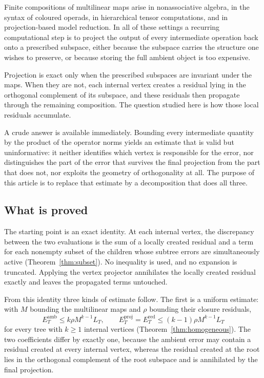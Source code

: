 \documentclass[11pt]{amsart}
\theoremstyle{definition}
\theoremstyle{remark}
\newcommand{\amb}{\mathrm{amb}}
\newcommand{\proj}{\mathrm{proj}}
\newcommand{\red}{\mathrm{red}}
\begin{document}
Finite compositions of multilinear maps arise in nonassociative algebra, in the syntax of
coloured operads, in hierarchical tensor computations, and in projection-based model
reduction. In all of these settings a recurring computational step is to project the
output of every intermediate operation back onto a prescribed subspace, either because
the subspace carries the structure one wishes to preserve, or because storing the full
ambient object is too expensive.

Projection is exact only when the prescribed subspaces are invariant under the maps. When
they are not, each internal vertex creates a residual lying in the orthogonal complement
of its subspace, and these residuals then propagate through the remaining composition.
The question studied here is how those local residuals accumulate.

A crude answer is available immediately. Bounding every intermediate quantity by the
product of the operator norms yields an estimate that is valid but uninformative: it
neither identifies which vertex is responsible for the error, nor distinguishes the part
of the error that survives the final projection from the part that does not, nor exploits
the geometry of orthogonality at all. The purpose of this article is to replace that
estimate by a decomposition that does all three.

\subsection*{What is proved}

The starting point is an exact identity. At each internal vertex, the discrepancy between
the two evaluations is the sum of a locally created residual and a term for each nonempty
subset of the children whose subtree errors are simultaneously active
(Theorem~\ref{thm:subset}). No inequality is used, and no expansion is truncated. Applying
the vertex projector annihilates the locally created residual exactly and leaves the
propagated terms untouched.

From this identity three kinds of estimate follow. The first is a uniform estimate: with
$M$ bounding the multilinear maps and $\rho$ bounding their closure residuals,
\[
 E_T^{\amb}\le k\rho M^{k-1}L_T,
 \qquad
 E_T^{\proj}=E_T^{\red}\le(k-1)\rho M^{k-1}L_T
\]
for every tree with $k\ge1$ internal vertices (Theorem~\ref{thm:homogeneous}). The two
coefficients differ by exactly one, because the ambient error may contain a residual
created at every internal vertex, whereas the residual created at the root lies in the
orthogonal complement of the root subspace and is annihilated by the final projection.
\end{document}
